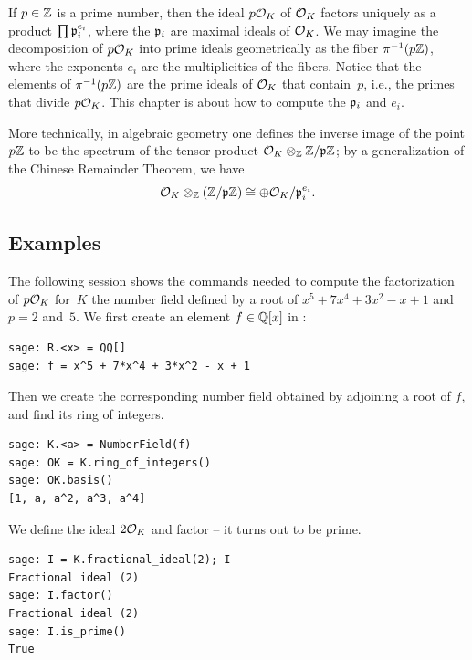 If $p\in\mathbb{Z}$ is a prime number, then the ideal $p\mathcal{O}_K$ of $\mathcal{O}_K$
factors uniquely as a product $\prod \mathfrak{p}_i^{e_i}$, where the $\mathfrak{p}_i$ are
maximal ideals of $\mathcal{O}_K$.  We may imagine the decomposition of $p\mathcal{O}_K$
into prime ideals geometrically as the fiber $\pi^{-1}(p\mathbb{Z})$, where
the exponents $e_i$ are the multiplicities of the fibers.  Notice that
the elements of $\pi^{-1}(p\mathbb{Z})$ are the prime ideals of $\mathcal{O}_K$ that
contain~$p$, i.e., the primes that divide $p\mathcal{O}_K$.
This chapter is about how to compute the $\mathfrak{p}_i$ and $e_i$.





\begin{remark}
  More technically, in algebraic geometry one defines the inverse
  image of the point $p\mathbb{Z}$ to be the spectrum of the tensor product
  $\mathcal{O}_K \otimes_{\mathbb{Z}} \mathbb{Z}/\mathfrak{p}\mathbb{Z}$; by a generalization of the Chinese
  Remainder Theorem, we have
$$
  \mathcal{O}_K \otimes_{\mathbb{Z}} \left(\mathbb{Z}/\mathfrak{p}\mathbb{Z}\right) \cong \oplus \mathcal{O}_K/\mathfrak{p}_i^{e_i}.
$$
\end{remark}



\subsection{Examples}
The following \sage session shows the commands needed to compute
the factorization of $p\mathcal{O}_K$ for~$K$ the number field
defined by a root of $x^5+7x^4+3x^2-x+1$ and $p=2$ and~$5$.
We first create an element $f\in \mathbb{Q}[x]$ in \sage:
\begin{verbatim}
sage: R.<x> = QQ[]
sage: f = x^5 + 7*x^4 + 3*x^2 - x + 1
\end{verbatim}%

\par\noindent{}Then we create the corresponding number field obtained
by adjoining a root of $f$, and find its ring of integers.
\begin{verbatim}
sage: K.<a> = NumberField(f)
sage: OK = K.ring_of_integers()
sage: OK.basis()
[1, a, a^2, a^3, a^4]
\end{verbatim}%

\par\noindent{}We define the ideal $2\mathcal{O}_K$ and factor -- it turns
out to be prime.
\begin{verbatim}
sage: I = K.fractional_ideal(2); I
Fractional ideal (2)
sage: I.factor()
Fractional ideal (2)
sage: I.is_prime()
True
\end{verbatim}%

